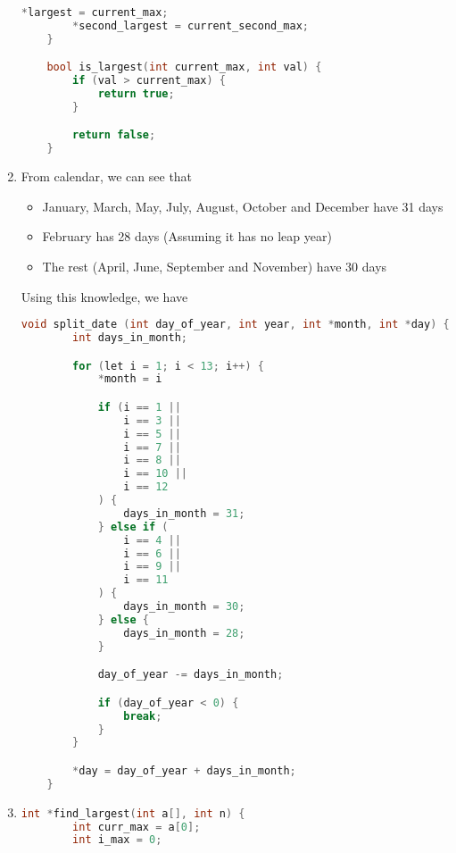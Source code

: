 \documentclass[12pt]{article}
\begin{document}
\begin{enumerate}[1.]
\begin{lstlisting}[language=c]
        *largest = current_max;
        *second_largest = current_second_max;
    }

    bool is_largest(int current_max, int val) {
        if (val > current_max) {
            return true;
        }

        return false;
    }
\end{lstlisting}

    \item

    From calendar, we can see that

    \begin{itemize}
        \item January, March, May, July, August, October and December have 31 days
        \item February has 28 days (Assuming it has no leap year)
        \item The rest (April, June, September and November) have 30 days
    \end{itemize}

    \bigskip

    Using this knowledge, we have


\begin{lstlisting}[language=c]
    void split_date (int day_of_year, int year, int *month, int *day) {
        int days_in_month;

        for (let i = 1; i < 13; i++) {
            *month = i

            if (i == 1 ||
                i == 3 ||
                i == 5 ||
                i == 7 ||
                i == 8 ||
                i == 10 ||
                i == 12
            ) {
                days_in_month = 31;
            } else if (
                i == 4 ||
                i == 6 ||
                i == 9 ||
                i == 11
            ) {
                days_in_month = 30;
            } else {
                days_in_month = 28;
            }

            day_of_year -= days_in_month;

            if (day_of_year < 0) {
                break;
            }
        }

        *day = day_of_year + days_in_month;
    }
\end{lstlisting}

    \item

    \bigskip

\begin{lstlisting}[language=c]
    int *find_largest(int a[], int n) {
        int curr_max = a[0];
        int i_max = 0;


\end{lstlisting}
\end{enumerate}
\end{document}
